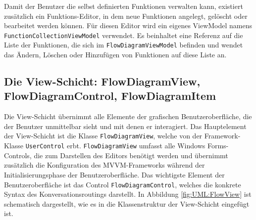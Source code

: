 \newline
Damit der Benutzer die selbst definierten Funktionen verwalten kann, existiert zusätzlich ein Funktions-Editor, in dem neue Funktionen angelegt, gelöscht oder bearbeitet werden können. Für diesen Editor wird ein eigenes ViewModel namens \texttt{FunctionCollectionViewModel} verwendet. Es beinhaltet eine Referenz auf die Liste der Funktionen, die sich im \texttt{FlowDiagramViewModel} befinden und wendet das Ändern, Löschen oder Hinzufügen von Funktionen auf diese Liste an.

\subsection[Die View-Schicht]{Die View-Schicht: FlowDiagramView, FlowDiagramControl, FlowDiagramItem}
Die View-Schicht übernimmt alle Elemente der grafischen Benutzeroberfläche, die der Benutzer unmittelbar sieht und mit denen er interagiert. Das Hauptelement der View-Schicht ist die Klasse \texttt{FlowDiagramView}, welche von der Framework-Klasse \texttt{UserControl} erbt. \texttt{FlowDiagramView} umfasst alle Windows Forms-Controls, die zum Darstellen des Editors benötigt werden und übernimmt zusätzlich die Konfiguration des MVVM-Frameworks während der Initialisierungsphase der Benutzeroberfläche.
\newline  
Das wichtigste Element der Benutzeroberfläche ist das Control \texttt{Flow\-Dia\-gram\-Con\-trol}, welches  die konkrete Syntax des Konversationsroutings darstellt. In Abbildung \ref{fig:UML:FlowView} ist schematisch dargestellt, wie es in die Klassenstruktur der View-Schicht eingefügt ist. 

